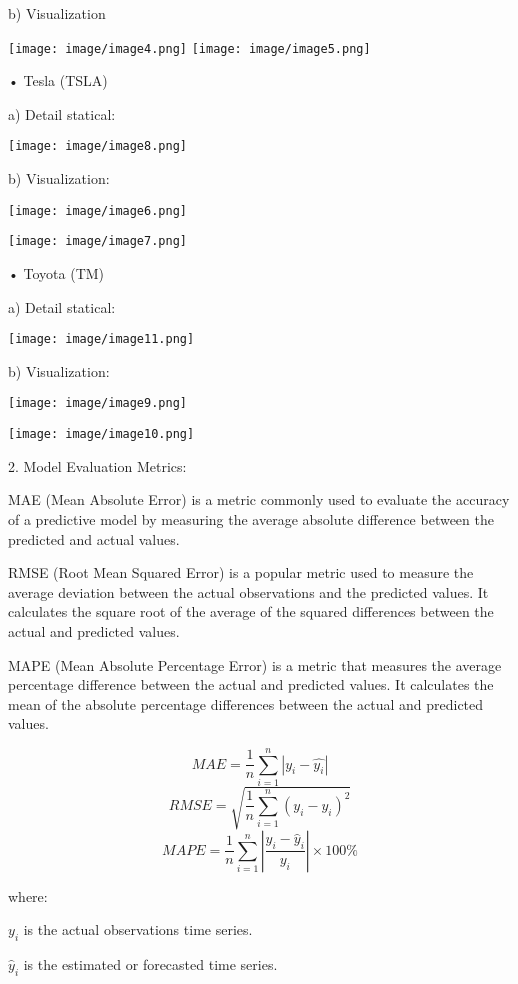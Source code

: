 \documentclass{ieeeojies}
\begin{document}
b) Visualization

\texttt{[image: image/image4.png]}
\texttt{[image: image/image5.png]}

•	Tesla (TSLA)

\hspace{0.5cm}a)	Detail statical:

\texttt{[image: image/image8.png]}

\hspace{0.5cm}b)	Visualization:

\texttt{[image: image/image6.png]}

\texttt{[image: image/image7.png]}

•	Toyota (TM)

\hspace{0.5cm}a)	Detail statical:

\texttt{[image: image/image11.png]}

\hspace{0.5cm}b)	Visualization:

\texttt{[image: image/image9.png]}

\texttt{[image: image/image10.png]}

2. Model Evaluation Metrics:

MAE (Mean Absolute Error) is a metric commonly used to evaluate the accuracy of a predictive model by measuring the average absolute difference between the predicted and actual values.

RMSE (Root Mean Squared Error) is a popular metric used
to measure the average deviation between the actual
observations and the predicted values. It calculates the square
root of the average of the squared differences between the actual
and predicted values.

MAPE (Mean Absolute Percentage Error) is a metric that
measures the average percentage difference between the actual
and predicted values. It calculates the mean of the absolute
percentage differences between the actual and predicted values.

$$MAE = \frac{1}{n}\sum_{i=1}^{n} |y_i - \hat{y_i}|$$
$$RMSE = \sqrt{\frac{1}{n}\sum_{i=1}^{n} (y_i - \hat{y_i})^2}$$
$$MAPE = \frac{1}{n} \sum_{i=1}^{n} \left| \frac{y_i - \hat{y}_i}{y_i} \right| \times 100\%$$

where: 

$y_i$ is the actual observations time series.

$\hat{y}_i$ is the estimated or forecasted time series.
\end{document}
